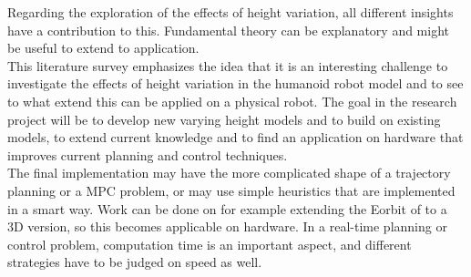 Regarding the exploration of the effects of height variation, all different insights have a contribution to this. Fundamental theory can be explanatory and might be useful to extend to application.  \\
This literature survey emphasizes the idea that it is an interesting challenge to investigate the effects of height variation in the humanoid robot model and to see to what extend this can be applied on a physical robot. The goal in the research project will be to develop new varying height models and to build on existing models, to extend current knowledge and to find an application on hardware that improves current planning and control techniques.\\
The final implementation may have the more complicated shape of a trajectory planning or a \ac{MPC} problem, or may use simple heuristics that are implemented in a smart way. Work can be done on for example extending the \ac{Eorbit} of \cite{pratt2007derivation} to a \ac{3D} version, so this becomes applicable on hardware. In a real-time planning or control problem, computation time is an important aspect, and different strategies have to be judged on speed as well. 
